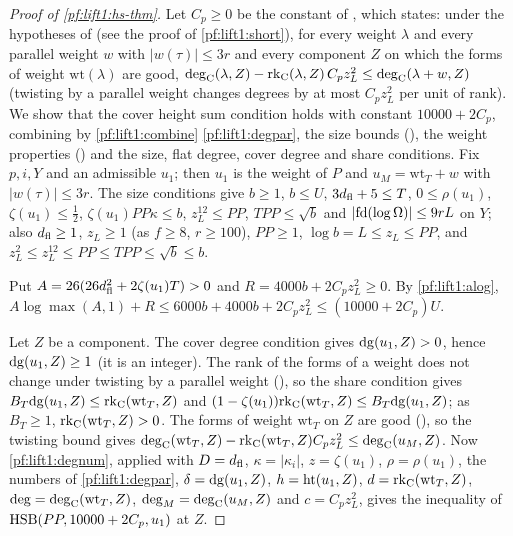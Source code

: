 \begin{proof}[Proof of \cref{pf:lift1:hs-thm}]
Let $C_p\ge0$ be the constant of , which
states: under the hypotheses of  (see the proof of
\cref{pf:lift1:short}), for every weight $\lambda$ and every parallel weight $w$ with $|w(\tau)|\le3r$
and every component $Z$ on which the forms of weight $\mathrm{wt}(\lambda)$ are good,
$\mathrm{deg}_{\mathrm{C}}(\lambda,Z)-\mathrm{rk}_{\mathrm{C}}(\lambda,Z)\,C_pz_L^2\le\mathrm{deg}_{\mathrm{C}}(\lambda+w,Z)$ (twisting by a parallel
weight changes degrees by at most $C_pz_L^2$ per unit of rank). We show that the cover height sum
condition holds with constant $10000+2C_p$, combining by \cref{pf:lift1:combine}
\cref{pf:lift1:degpar}, the size bounds (), the weight
properties () and the size, flat degree,
cover degree and share conditions. Fix $p,i,Y$ and an admissible $u_1$; then $u_1$ is the weight of
$P$ and $u_M=\mathrm{wt}_T+w$ with $|w(\tau)|\le3r$. The size conditions give $b\ge1$, $b\le U$,
$3d_{\mathrm{fl}}+5\le T$, $0\le\rho(u_1)$, $\zeta(u_1)\le\frac12$, $\zeta(u_1)PP\kappa\le b$,
$z_L^{12}\le PP$, $TPP\le\sqrt b$ and $|\mathrm{fd}(\log\Omega)|\le9rL$ on $Y$; also $d_{\mathrm{fl}}\ge1$,
$z_L\ge1$ (as $f\ge8$, $r\ge100$), $PP\ge1$, $\log b=L\le z_L\le PP$, and $z_L^2\le z_L^{12}\le PP\le TPP\le\sqrt
b\le b$.

Put $A=26(26d_{\mathrm{fl}}^2+2\zeta(u_1)T)>0$ and $R=4000b+2C_pz_L^2\ge0$. By \cref{pf:lift1:alog},
$A\log\max(A,1)+R\le6000b+4000b+2C_pz_L^2\le(10000+2C_p)U$.

Let $Z$ be a component. The cover degree condition gives $\mathrm{dg}(u_1,Z)>0$, hence
$\mathrm{dg}(u_1,Z)\ge1$ (it is an integer). The rank of the forms of a weight does not change under
twisting by a parallel weight (), so the share
condition gives $B_T\mathrm{dg}(u_1,Z)\le\mathrm{rk}_{\mathrm{C}}(\mathrm{wt}_T,Z)$ and
$(1-\zeta(u_1))\mathrm{rk}_{\mathrm{C}}(\mathrm{wt}_T,Z)\le B_T\mathrm{dg}(u_1,Z)$; as $B_T\ge1$,
$\mathrm{rk}_{\mathrm{C}}(\mathrm{wt}_T,Z)>0$. The forms of weight $\mathrm{wt}_T$ on $Z$ are good
(), so the twisting bound gives
$\mathrm{deg}_{\mathrm{C}}(\mathrm{wt}_T,Z)-\mathrm{rk}_{\mathrm{C}}(\mathrm{wt}_T,Z)C_pz_L^2\le\mathrm{deg}_{\mathrm{C}}(u_M,Z)$. Now
\cref{pf:lift1:degnum}, applied with $D=d_{\mathrm{fl}}$, $\kappa=|\kappa_i|$, $z=\zeta(u_1)$, $\rho=\rho(u_1)$,
the numbers of \cref{pf:lift1:degpar}, $\delta=\mathrm{dg}(u_1,Z)$, $h=\mathrm{ht}(u_1,Z)$,
$d=\mathrm{rk}_{\mathrm{C}}(\mathrm{wt}_T,Z)$, $\deg=\mathrm{deg}_{\mathrm{C}}(\mathrm{wt}_T,Z)$, $\deg_M=\mathrm{deg}_{\mathrm{C}}(u_M,Z)$ and
$c=C_pz_L^2$, gives the inequality of $\mathrm{HSB}(PP,10000+2C_p,u_1)$ at $Z$.
\end{proof}

